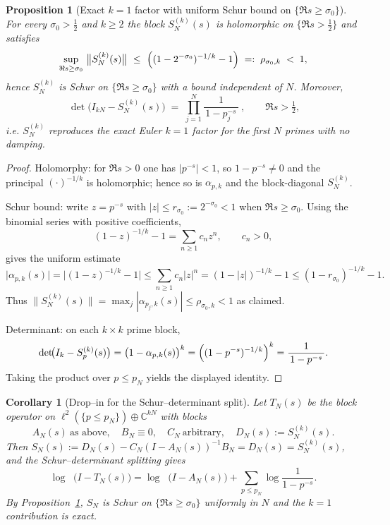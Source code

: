 \documentclass[11pt]{article}
\newtheorem{proposition}[theorem]{Proposition}
\newtheorem{corollary}[theorem]{Corollary}
\theoremstyle{remark}
\newcommand{\C}{\mathbb{C}}
\DeclareMathOperator{\dettwo}{det_2}
\begin{document}
\begin{proposition}[Exact $k=1$ factor with uniform Schur bound on $\{\Re s\ge \sigma_0\}$]
\label{prop:kfold}
For every $\sigma_0>\tfrac12$ and $k\ge 2$ the block $S_{N}^{(k)}(s)$ is holomorphic on $\{\Re s>\tfrac12\}$ and satisfies
\[
 \sup_{\Re s\ge \sigma_0}\ \bigl\|S_{N}^{(k)}(s)\bigr\|\ \le\ \Bigl((1-2^{-\sigma_0})^{-1/k}-1\Bigr)\;=:\;\rho_{\sigma_0,k}\;<\;1,
\]
hence $S_{N}^{(k)}$ is Schur on $\{\Re s\ge \sigma_0\}$ with a bound independent of $N$. Moreover,
\[
 \boxed{\ \det\!\bigl(I_{kN}-S_{N}^{(k)}(s)\bigr)\;=\;\prod_{j=1}^{N}\frac{1}{\,1-p_j^{-s}\,}\ },\qquad \Re s>\tfrac12,
\]
i.e. $S_{N}^{(k)}$ reproduces the exact Euler $k=1$ factor for the first $N$ primes with no damping.
\end{proposition}

\begin{proof}
Holomorphy: for $\Re s>0$ one has $|p^{-s}|<1$, so $1-p^{-s}\neq 0$ and the principal $(\cdot)^{-1/k}$ is holomorphic; hence so is $\alpha_{p,k}$ and the block-diagonal $S_{N}^{(k)}$.

Schur bound: write $z=p^{-s}$ with $|z|\le r_{\sigma_0}:=2^{-\sigma_0}<1$ when $\Re s\ge \sigma_0$. Using the binomial series with positive coefficients,
\[
 (1-z)^{-1/k}-1=\sum_{n\ge 1} c_n z^n,\qquad c_n>0,
\]
gives the uniform estimate
\[
 \bigl|\alpha_{p,k}(s)\bigr|=\bigl|(1-z)^{-1/k}-1\bigr|\le \sum_{n\ge 1} c_n |z|^n
= (1-|z|)^{-1/k}-1 \le (1-r_{\sigma_0})^{-1/k}-1.
\]
Thus $\|S_{N}^{(k)}(s)\|=\max_{j}|\alpha_{p_j,k}(s)|\le \rho_{\sigma_0,k}<1$ as claimed.

Determinant: on each $k\times k$ prime block,
\[
 \det\!\bigl(I_k-S_{p}^{(k)}(s)\bigr)=\bigl(1-\alpha_{p,k}(s)\bigr)^{k}=\Bigl((1-p^{-s})^{-1/k}\Bigr)^{k}=\frac{1}{\,1-p^{-s}\,}.
\]
Taking the product over $p\le p_N$ yields the displayed identity.
\end{proof}

\begin{corollary}[Drop--in for the Schur--determinant split]
\label{cor:dropin}
Let $T_N(s)$ be the block operator on $\ell^2(\{p\le p_N\})\oplus\C^{kN}$ with blocks
\[
 A_N(s)\ \text{as above},\quad B_N\equiv 0,\quad C_N\ \text{arbitrary},\quad D_N(s):=S_{N}^{(k)}(s).
\]
Then $S_N(s):=D_N(s)-C_N(I-A_N(s))^{-1}B_N=D_N(s)=S_{N}^{(k)}(s)$, and the Schur--determinant splitting gives
\[
 \log\dettwo\bigl(I-T_N(s)\bigr)=\log\dettwo\bigl(I-A_N(s)\bigr)+\sum_{p\le p_N}\log\!\frac{1}{1-p^{-s}}.
\]
By Proposition~\ref{prop:kfold}, $S_N$ is Schur on $\{\Re s\ge \sigma_0\}$ uniformly in $N$ and the $k=1$ contribution is exact.
\end{corollary}
\end{document}
